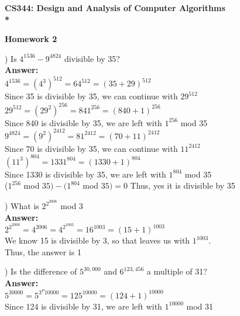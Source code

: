 \documentclass{article}
\begin{document}
\begin{center}
\bf{\LARGE CS344: Design and Analysis of Computer Algorithms} \\*

\vspace{0.2in}
{\bf {\Large Homework 2}}
\end{center}

\vspace{.2in}


\vspace{.2in}
) Is $4^{1536} - 9^{4824}$ divisible by 35? \\
\vspace{.1in}
{\bf Answer:} \\
\indent $4^{1536} = (4^3)^{512} = 64^{512} = (35 + 29)^{512}$ \\
\indent Since 35 is divisible by 35, we can continue with $29^{512}$ \\
\indent $29^{512} = (29^2)^{256} = 841^{256} = (840 + 1)^{256}$ \\
\indent Since 840 is divisible by 35, we are left with $1^{256}$ mod 35 \\

\indent $9^4824 = (9^2)^{2412} = 81^{2412} = (70 + 11)^{2412}$ \\
\indent Since 70 is divisible by 35, we can continue with $11^{2412}$ \\
\indent $(11^3)^{804} = 1331^{804} = (1330 + 1)^{804}$ \\
\indent Since 1330 is divisible by 35, we are left with $1^{804}$ mod 35 \\

\indent ($1^{256}$ mod $35) - (1^{804}$ mod $35) = 0$  Thus, yes it is divisible by 35

\vspace{.3in}
) What is $2^{2^{2006}}$ mod 3 \\
\vspace{.1in}
{\bf Answer:} \\
\indent $2^{2^{2006}} =  4^{2006} = 4^{2^{1003}} = 16^{1003 } = (15 + 1)^{1003}$ \\
\indent We know 15 is divisible by 3, so that leaves us with $1^{1003}$. \\
\indent Thus, the answer is 1

\vspace{.3in}
) Is the difference of $5^{30,000}$ and $6^{123,456}$ a multiple of 31? \\
\vspace{.1in}
{\bf Answer:} \\
\indent $5^{30000} = 5^{3^P{10000}} = 125^{10000} = (124 + 1)^{10000}$ \\
\indent Since 124 is divisible by 31, we are left with $1^{10000} $ mod 31 \\
\end{document}
